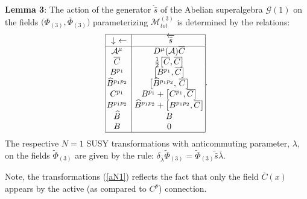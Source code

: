 \documentclass[10pt]{article}
\begin{document}
 \noindent
\textbf{Lemma 3}: The action of the generator  $\overleftarrow{\bar{s}}$ of the Abelian superalgebra $\mathcal{G}(1)$ on the fields $\big({\Phi}_{(3)}, \overline{\Phi}_{(3)}\big)$ parameterizing $\mathcal{M}^{(3)}_{tot}$ is determined by the relations:
 \begin{equation}\label{aN1}
\begin{array}{|c|c |}\hline%
  \downarrow \  \leftarrow \!&\!  \overleftarrow{\bar{s}}{}\!\! \!\! \\
   \hline%
    \! \! \mathcal{A}^\mu &\! D^\mu(\mathcal{A}) \overline{C} \!\!   \\
\!\! \overline{C}    &\! %
\textstyle\frac{1}{2}\big[\overline{C}, \overline{C}\big] \!\!   \\
 \!\! B^{p_1}    &\!
\big[B^{p_1}, \overline{C}\big] \!\!   \\
    \!\! \widehat{B}{}^{p_1p_2}    &\!
     \big[\widehat{B}{}^{p_1p_2},\,\overline{C}\big]      \!\!   \\
 \!\! C^{p_1}    &\! B^{p_1}+%
\big[C^{p_1}, \overline{C}\big] \!\!   \\
 \!\! B^{p_1p_2}    &\!  \widehat{B}{}^{p_1p_2}+ \big[B^{p_1p_2}, \overline{C}\big] \!\!   \\
    \!\! \widehat{B}    &\! B  \!\!   \\
    \!\! B    &\!  0 \!\!   \\
   \cline{1-2}%
\end{array}. \end{equation}
The respective $N=1$ SUSY transformations with  anticommuting parameter, $\lambda$, on the fields $\widetilde{\Phi}_{(3)}$  are given by the rule: $\delta_{\bar{\lambda}} \widetilde{\Phi}_{(3)} = \widetilde{\Phi}_{(3)} \overleftarrow{\bar{s}} \bar{\lambda} $.


\vspace{1ex}
Note,  the transformations (\ref{aN1}) reflects the fact that only the field $\overline{C}(x)$ appears by the active (as compared to $C^p$) connection.
\end{document}
